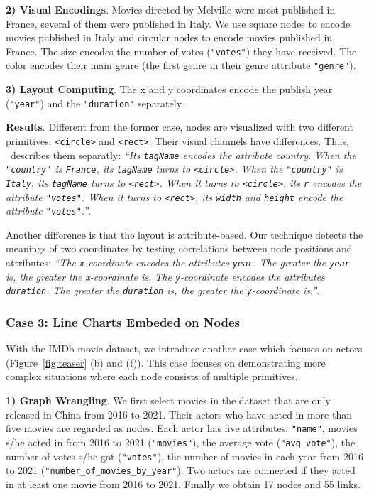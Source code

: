 \textbf{2) Visual Encodings}.
Movies directed by Melville were most published in France, several of them were published in Italy.
We use square nodes to encode movies published in Italy and circular nodes to encode movies published in France.
The size encodes the number of votes (\texttt{"votes"}) they have received.
The color encodes their main genre (the first genre in their genre attribute \texttt{"genre"}).

\textbf{3) Layout Computing}.
The x and y coordinates encode the publish year (\texttt{"year"}) and the \texttt{"duration"} separately.

\textbf{Results}.
Different from the former case, nodes are visualized with two different primitives: \texttt{<circle>} and \texttt{<rect>}.
Their visual channels have differences.
Thus, \ApproachName~describes them separatly:
\textit{``Its \texttt{tagName} encodes the attribute country.
When the \texttt{"country"} is \texttt{France}, its \texttt{tagName} turns to \texttt{<circle>}.
When the \texttt{"country"} is \texttt{Italy}, its \texttt{tagName} turns to \texttt{<rect>}.
When it turns to \texttt{<circle>}, 
its \texttt{r} encodes the attribute \texttt{"votes"}.
When it turns to \texttt{<rect>}, its \texttt{width} and \texttt{height} encode the attribute \texttt{"votes"}.''}.

Another difference is that the layout is attribute-based.
Our technique detects the meanings of two coordinates by testing correlations between node positions and attributes: 
\textit{``The \texttt{x}-coordinate encodes the attributes \texttt{year}. 
The greater the \texttt{year} is, the greater the x-coordinate is.
The \texttt{y}-coordinate encodes the attributes \texttt{duration}.
The greater the \texttt{duration} is, the greater the \texttt{y}-coordinate is.''}.

\subsubsection{Case 3: Line Charts Embeded on Nodes}
With the IMDb movie dataset, we introduce another case which focuses on actors (Figure~\ref{fig:teaser} (b) and (f)).
This case focuses on demonstrating more complex situations where each node consists of multiple primitives.

\textbf{1) Graph Wrangling}. We first select movies in the dataset that are only released in China from 2016 to 2021.
Their actors who have acted in more than five movies are regarded as nodes.
Each actor has five attributes: \texttt{"name"}, movies s/he acted in from 2016 to 2021 (\texttt{"movies"}), the average vote (\texttt{"avg\_vote"}), the number of votes s/he got (\texttt{"votes"}), the number of movies in each year from 2016 to 2021 (\texttt{"number\_of\_movies\_by\_year"}).
Two actors are connected if they acted in at least one movie from 2016 to 2021.
Finally we obtain 17 nodes and 55 links.

